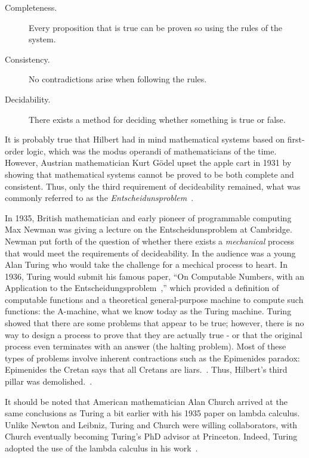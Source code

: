 \begin{description}
\item[Completeness.] Every proposition that is true can be proven so using the rules of the system.
\item[Consistency.] No contradictions arise when following the rules.
\item[Decidability.] There exists a method for deciding whether something is true or false.
\end{description}

It is probably true that Hilbert had in mind mathematical systems based on first-order logic, which was the modus
operandi of mathematicians of the time.  However, Austrian mathematician Kurt G\"{o}del upset the apple cart in
1931 by showing that mathematical systems cannot be proved to be both complete and consistent.  Thus, only the
third requirement of decideability remained, what was commonly referred to as the
\emph{Entscheidunsproblem}~\cite{dturing}.

In 1935, British mathematician and early pioneer of programmable computing Max Newman was giving a lecture on the
Entscheidunsproblem at Cambridge.  Newman put forth of the question of whether there exists a \emph{mechanical}
process that would meet the requirements of decideability.  In the audience was a young Alan Turing who would take
the challenge for a mechical process to heart.  In 1936, Turing would submit his famous paper, ``On Computable
Numbers, with an Application to the Entscheidungsproblem~\cite{aturing},'' which provided a definition of
computable functions and a theoretical general-purpose machine to compute such functions: the A-machine, what we
know today as the Turing machine.  Turing showed that there are some problems that appear to be true; however,
there is no way to design a process to prove that they are actually true - or that the original process even
terminates with an answer (the halting problem).  Most of these types of problems involve inherent contractions
such as the Epimenides paradox: Epimenides the Cretan says that all Cretans are liars.~\cite{dturing}.  Thus,
Hilbert's third pillar was demolished.~\cite{dturing}.

It should be noted that American mathematician Alan Church arrived at the same conclusions as Turing a bit earlier
with his 1935 paper on lambda calculus.  Unlike Newton and Leibniz, Turing and Church were willing collaborators,
with Church eventually becoming Turing's PhD advisor at Princeton.  Indeed, Turing adopted the use of the lambda
calculus in his work~\cite{dturing}.

